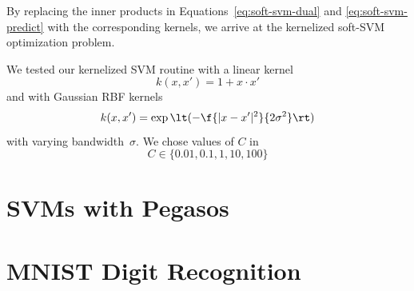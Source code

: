 \documentclass{article}
\begin{document}
\begin{multicols}{2}
By replacing the inner products in
Equations~\ref{eq:soft-svm-dual} and \ref{eq:soft-svm-predict}
with the corresponding kernels,
we arrive at the kernelized soft-SVM optimization problem.

We tested our kernelized SVM routine with a linear kernel
\begin{equation}
    k(x, x') = 1 + x\cdot x'
\end{equation}
and with Gaussian RBF kernels
\begin{equation}
    k(x, x') = \exp\lt(-\f{|x - x'|^2}{2\sigma^2}\rt)
\end{equation}
with varying bandwidth~$\sigma$.  %
We chose values of $C$ in
\[
    C \in \{0.01, 0.1, 1, 10, 100\}
\]

%
%




\section{SVMs with Pegasos}


\section{MNIST Digit Recognition}


\end{multicols}
\end{document}
